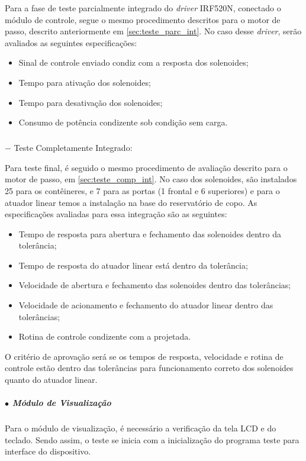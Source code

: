 Para a fase de teste parcialmente integrado do \textit{driver} IRF520N, conectado o módulo de controle, segue o mesmo procedimento descritos para o motor de passo, descrito anteriormente em \ref{sec:teste_parc_int}. No caso desse \textit{driver}, serão avaliados as seguintes especificações: 

\begin{itemize}
    \item Sinal de controle enviado condiz com a resposta dos solenoides;
    \item Tempo para ativação dos solenoides;
    \item Tempo para desativação dos solenoides;
    \item Consumo de potência condizente sob condição sem carga.
\end{itemize}

\subparagraph*{} $-$ Teste Completamente Integrado:

Para teste final, é seguido o mesmo procedimento de avaliação descrito para o motor de passo, em \ref{sec:teste_comp_int}. No caso dos solenoides, são instalados 25 para os contêineres, e 7 para as portas (1 frontal e 6 superiores) e para o atuador linear temos a instalação na base do reservatório de copo. As especificações avaliadas para essa integração são as seguintes:

\begin{itemize}
    \item Tempo de resposta para abertura e fechamento das solenoides dentro da tolerância;
    \item Tempo de resposta do atuador linear está dentro da tolerância;
    \item Velocidade de abertura e fechamento das solenoides dentro das tolerâncias;
    \item Velocidade de acionamento e fechamento do atuador linear dentro das tolerâncias; 
    \item Rotina de controle condizente com a projetada.
\end{itemize}

O critério de aprovação será se os tempos de resposta, velocidade e rotina de controle estão dentro das tolerâncias para funcionamento correto dos solenoides quanto do atuador linear.

\subparagraph*{$\bullet$ Módulo de Visualização} \hfill

Para o módulo de visualização, é necessário a verificação da tela LCD e do teclado. Sendo assim, o teste se inicia com a inicialização do programa teste para interface do dispositivo. 

